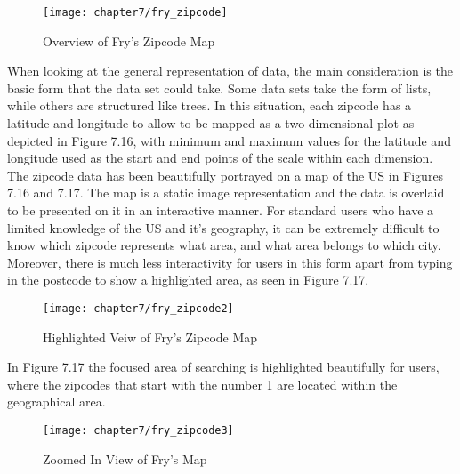 \begin{figure}[H]
\centering
\texttt{[image: chapter7/fry\_zipcode]}
\caption{Overview of Fry's Zipcode Map}
\end{figure}

When looking at the general representation of data, the main consideration is the basic form that the data set could take. Some data sets take the form of lists, while others are structured like trees. In this situation, each zipcode has a latitude and longitude to allow to be mapped as  a two-dimensional plot as depicted in Figure 7.16, with minimum and maximum values for the latitude and longitude used as the start and end points of the scale within each dimension. The zipcode data has been beautifully portrayed on a map of the US in Figures 7.16 and 7.17. The map is a static image representation and the data is overlaid to be presented on it in an interactive manner. For standard users who have a limited knowledge of the US and it's geography, it can be extremely difficult to know which zipcode represents what area, and what area belongs to which city. Moreover, there is much less interactivity for users in this form apart from typing in the postcode to show a highlighted area, as seen in Figure 7.17.

\begin{figure}[H]
\centering
\texttt{[image: chapter7/fry\_zipcode2]}
\caption{Highlighted Veiw of Fry's \cite{fry} Zipcode Map }
\end{figure}

In Figure 7.17 the focused area of searching is highlighted beautifully for users, where the zipcodes that start with the number 1 are located within the geographical area.

\begin{figure}[H]
\centering
\texttt{[image: chapter7/fry\_zipcode3]}
\caption{Zoomed In View of Fry's \cite{fry} Map }
\end{figure}

